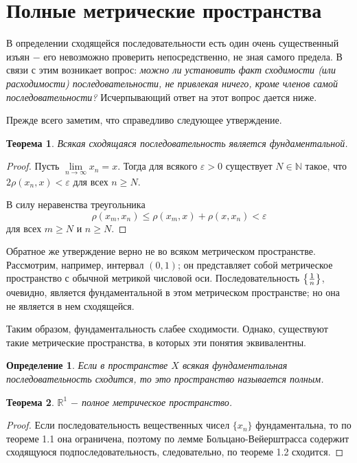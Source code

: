 \documentclass{article}
\newtheorem{theorem}{Теорема}[section]
\newtheorem{definition}{Определение}[section]
\begin{document}
\section{Полные метрические пространства}

В определении сходящейся последовательности есть один очень существенный изъян \(-\) его невозможно проверить непосредственно, не зная самого предела. В  связи  с  этим  возникает  вопрос:  \textit{можно  ли  установить  факт сходимости (или расходимости) последовательности,  не  привлекая ничего, кроме членов самой последовательности?} Исчерпывающий ответ на этот вопрос дается ниже.

Прежде всего заметим, что справедливо следующее утверждение.

\begin{theorem}
Всякая сходящаяся последовательность является фундаментальной.
\end{theorem}

\begin{proof}
Пусть \(\lim\limits_{n \to \infty} {x_n} = x\). Тогда для всякого \(\varepsilon > 0\) существует \(N \in \mathbb{N}\) такое, что \(2\rho(x_n, x) < \varepsilon\) для всех \(n \geq N\).

В силу неравенства треугольника
\[
\rho(x_m, x_n) \leq \rho(x_m, x) + \rho(x, x_n) < \varepsilon
\]
для всех \(m \geq N\) и \(n \geq N\).
\end{proof}

Обратное же утверждение верно не во всяком метрическом пространстве. Рассмотрим, например, интервал \((0, 1)\); он представляет собой метрическое пространство с обычной метрикой числовой оси. Последовательность
\(
\left\lbrace 1 \over n\right\rbrace
\),
очевидно, является фундаментальной в этом метрическом пространстве; но она не является в нем сходящейся.

Таким образом, фундаментальность слабее сходимости. Однако, существуют такие метрические пространства, в которых эти понятия эквивалентны.

\begin{definition}
Если в пространстве \(X\) всякая фундаментальная последовательность сходится, то это пространство называется полным.
\end{definition}

\begin{theorem}
\(\mathbb{R} ^ 1\) \(-\) полное метрическое пространство.
\end{theorem}

\begin{proof}
Если последовательность вещественных чисел \(\{x_n\}\) фундаментальна, то по теореме 1.1 она ограничена, поэтому по лемме Больцано-Вейерштрасса содержит сходящуюся подпоследовательность, следовательно, по теореме 1.2 сходится.
\end{proof}
\end{document}

